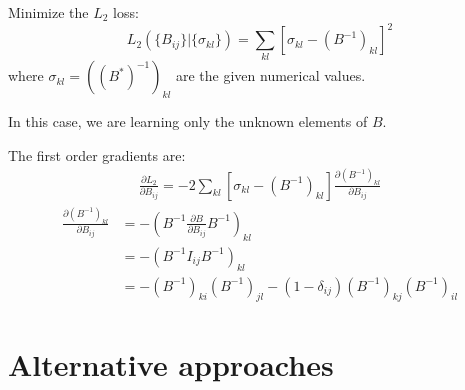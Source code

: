 \documentclass[11pt]{article}
\begin{document}

Minimize the $L_2$ loss:
\begin{equation}
L_2 ( \{ B_{ij} \} | \{ \sigma_{kl} \} ) = \sum_{kl} \left [ \sigma_{kl} - (B^{-1})_{kl} \right ]^2
\end{equation}
where $\sigma_{kl} = ((B^*)^{-1})_{kl}$ are the given numerical values.

In this case, we are learning only the unknown elements of $B$.

The first order gradients are:
\begin{equation}
\begin{split}
\frac{\partial L_2}{\partial B_{ij}}
=
- 2 \sum_{kl} \left [ \sigma_{kl} - (B^{-1})_{kl} \right ]
\frac{\partial (B^{-1})_{kl}}{\partial B_{ij}}
\end{split}
\end{equation}
\begin{equation}
\begin{split}
\frac{\partial (B^{-1})_{kl}}{\partial B_{ij}}
&= 
- \left ( B^{-1} \frac{\partial B}{\partial B_{ij}} B^{-1} \right )_{kl} \\
&= 
- \left ( B^{-1} I_{ij} B^{-1} \right )_{kl} \\
&=
- (B^{-1})_{ki} (B^{-1})_{jl} - (1 - \delta_{ij}) (B^{-1})_{kj} (B^{-1})_{il}
\end{split}
\end{equation}


\section{Alternative approaches}

\end{document}

